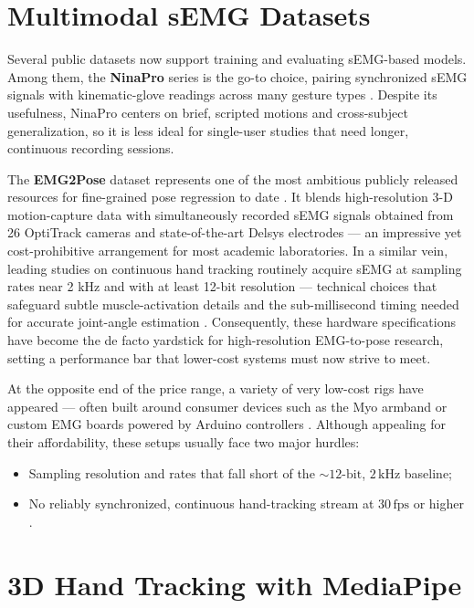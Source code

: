 \section{Multimodal sEMG Datasets}

Several public datasets now support training and evaluating sEMG-based models. Among them, the \textbf{NinaPro} series is the go-to choice, pairing synchronized sEMG signals with kinematic-glove readings across many gesture types \cite{zia2018multiday}. Despite its usefulness, NinaPro centers on brief, scripted motions and cross-subject generalization, so it is less ideal for single-user studies that need longer, continuous recording sessions.

The \textbf{EMG2Pose} dataset represents one of the most ambitious publicly released resources for fine-grained pose regression to date \cite{salter2024emg2pose}. It blends high-resolution 3-D motion-capture data with simultaneously recorded sEMG signals obtained from 26 OptiTrack cameras and state-of-the-art Delsys electrodes — an impressive yet cost-prohibitive arrangement for most academic laboratories. In a similar vein, leading studies on continuous hand tracking routinely acquire sEMG at sampling rates near 2 kHz and with at least 12-bit resolution — technical choices that safeguard subtle muscle-activation details and the sub-millisecond timing needed for accurate joint-angle estimation \cite{salter2024emg2pose, zanghieri2023semg, lee2022explainable}. Consequently, these hardware specifications have become the de facto yardstick for high-resolution EMG-to-pose research, setting a performance bar that lower-cost systems must now strive to meet.

At the opposite end of the price range, a variety of very low-cost rigs have appeared — often built around consumer devices such as the Myo armband or custom EMG boards powered by Arduino controllers \cite{nasri2020semg}. Although appealing for their affordability, these setups usually face two major hurdles:
\begin{itemize}
    \item Sampling resolution and rates that fall short of the \(\sim\!12\text{-bit}\), \(2\,\text{kHz}\) baseline;
    \item No reliably synchronized, continuous hand-tracking stream at \(30\,\text{fps}\) or higher \cite{graf2023combining}.
\end{itemize}

\section{3D Hand Tracking with MediaPipe}


